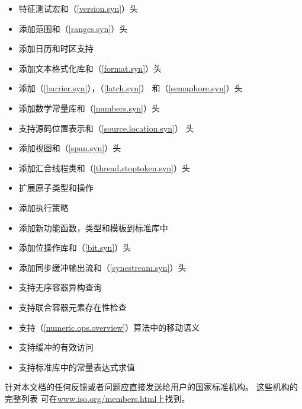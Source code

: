 \begin{itemize}
  \item{特征测试宏和（\ref{version.syn}）头}
  \item{添加范围和（\ref{ranges.syn}）头}
  \item{添加日历和时区支持}
  \item{添加文本格式化库和（\ref{format.syn}）头}
  \item{添加（\ref{barrier.syn}），（\ref{latch.syn}）
    和（\ref{semaphore.syn}）头}
  \item{添加数学常量库和（\ref{numbers.syn}）头}
  \item{支持源码位置表示和（\ref{source.location.syn}）
    头}
  \item{添加视图和（\ref{span.syn}）头}
  \item{添加汇合线程类和（\ref{thread.stoptoken.syn}）头}
  \item{扩展原子类型和操作}
  \item{添加执行策略}
  \item{添加新功能函数，类型和模板到标准库中}
  \item{添加位操作库和（\ref{bit.syn}）头}
  \item{添加同步缓冲输出流和（\ref{syncstream.syn}）头}
  \item{支持无序容器异构查询}
  \item{支持联合容器元素存在性检查}
  \item{支持（\ref{numeric.ops.overview}）算法中的移动语义}
  \item{支持缓冲的有效访问}
  \item{支持标准库中的常量表达式求值}
\end{itemize}

\noindent
针对本文档的任何反馈或者问题应直接发送给用户的国家标准机构。 这些机构的完整列表
可在\href{www.iso.org/members.html}{www.iso.org/members.html}上找到。
